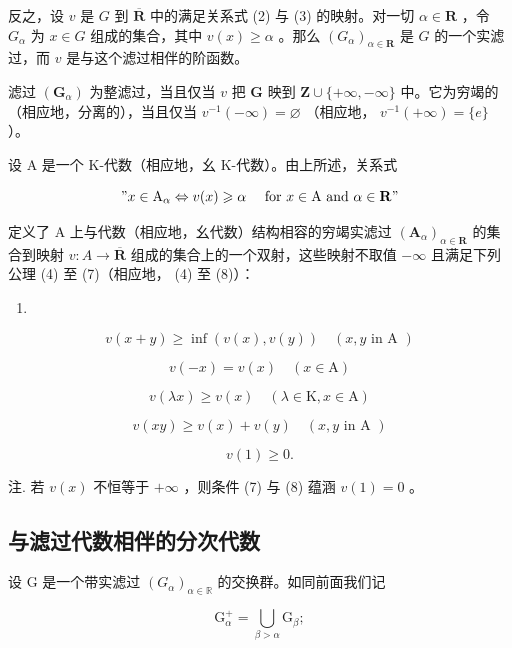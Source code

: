 反之，设 \(v\) 是 \(G\) 到 \(\overline{\mathbf{R}}\) 中的满足关系式 (2) 与 (3) 的映射。对一切 \(\alpha \in \mathbf{R}\) ，令 \(G_{\alpha}\) 为 \(x \in G\) 组成的集合，其中 \(v(x) \geqslant \alpha\) 。那么 \((G_{\alpha})_{\alpha \in \mathbf{R}}\) 是 \(G\) 的一个实滤过，而 \(v\) 是与这个滤过相伴的阶函数。

滤过 \((\mathbf{G}_{\alpha})\) 为整滤过，当且仅当 \(v\) 把 \(\mathbf{G}\) 映到 \(\mathbf{Z} \cup \{+\infty, -\infty\}\) 中。它为穷竭的（相应地，分离的），当且仅当 \(v^{-1}(-\infty) = \varnothing\) （相应地， \(v^{-1}(+\infty) = \{e\}\) ）。

设 A 是一个 K-代数（相应地，幺 K-代数）。由上所述，关系式

\[
" x \in \mathrm{A} _ {\alpha} \Leftrightarrow v (x) \geqslant \alpha \quad \text { for } x \in \mathrm{A} \text { and } \alpha \in \mathbf {R}"
\]

定义了 A 上与代数（相应地，幺代数）结构相容的穷竭实滤过 \((\mathbf{A}_{\alpha})_{\alpha\in\mathbf{R}}\) 的集合到映射 \(v: A \to \overline{\mathbf{R}}\) 组成的集合上的一个双射，这些映射不取值 \(-\infty\) 且满足下列公理 (4) 至 (7)（相应地， (4) 至 (8)）：

\begin{enumerate}
\def\labelenumi{(\arabic{enumi})}
\setcounter{enumi}{3}
\tightlist
\item
\end{enumerate}

\[
v (x + y) \geqslant \inf (v (x), v (y)) \quad (x, y \text {   in   A })\tag{5}
\]

\[
v (- x) = v (x) \quad (x \in \mathrm{A})\tag{6}
\]

\[
v (\lambda x) \geqslant v (x) \quad (\lambda \in \mathrm{K}, x \in \mathrm{A})\tag{7}
\]

\[
v (x y) \geqslant v (x) + v (y) \quad (x, y \text {   in   A })\tag{8}
\]

\[
v (1) \geqslant 0.
\]

注. 若 \(v(x)\) 不恒等于 \(+\infty\) ，则条件 (7) 与 (8) 蕴涵 \(v(1) = 0\) 。

\subsection{与滤过代数相伴的分次代数}

设 G 是一个带实滤过 \((G_{\alpha})_{\alpha \in \mathbb{R}}\) 的交换群。如同前面我们记

\[
\mathrm{G} _ {\alpha} ^ {+} = \bigcup_ {\beta > \alpha} \mathrm{G} _ {\beta};\tag{9}
\]

